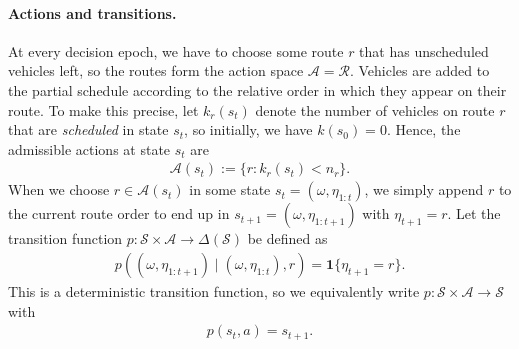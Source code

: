 \documentclass[a4paper]{report}
\theoremstyle{definition}
\theoremstyle{plain}
\begin{document}
\paragraph{Actions and transitions.}

At every decision epoch, we have to choose some route $r$ that has unscheduled
vehicles left, so the routes form the action space $\mathcal{A} = \mathcal{R}$.
%
Vehicles are added to the partial schedule according to the relative order in
which they appear on their route.
%
To make this precise, let $k_r(s_t)$ denote the number of vehicles on route $r$
that are \emph{scheduled} in state $s_t$, so initially, we have $k(s_0) = 0$.
%
Hence, the admissible actions at state $s_t$ are
\begin{align}
  \mathcal{A}(s_t) := \{ r: k_r(s_t) < n_r \} .
\end{align}
%
When we choose $r \in \mathcal{A}(s_t)$ in some state $s_t = (\omega, \eta_{1:t})$,
we simply append $r$ to the current route order to end up in $s_{t+1} = (\omega, \eta_{1:t+1})$ with $\eta_{t+1} = r$.
Let the transition function
$p : \mathcal{S} \times \mathcal{A} \rightarrow \Delta(\mathcal{S})$ be defined as
\begin{align}
  p((\omega, \eta_{1:t+1}) \mid (\omega, \eta_{1:t}), r) = \mathbf{1}\{ \eta_{t+1} = r \} .
\end{align}
%
This is a deterministic transition function, so we equivalently write
$p:\mathcal{S} \times \mathcal{A} \rightarrow \mathcal{S}$ with 
\begin{align}
  p(s_t, a) = s_{t+1} .
\end{align}


\end{document}
